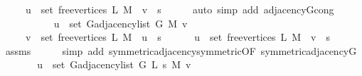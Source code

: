 \begin{isabellebody}
\ \ \ \ \ {\isacharparenleft}{\kern0pt}u\ {\isasymin}\ set\ {\isacharparenleft}{\kern0pt}free{\isacharunderscore}{\kern0pt}vertices\ L\ M{\isacharparenright}{\kern0pt}\ {\isasymand}\ v\ {\isacharequal}{\kern0pt}\ s{\isacharparenright}{\kern0pt}{\isachardoublequoteclose}\isanewline
\ \ \ \ \isamarkupfalse%
\ {\isacharparenleft}{\kern0pt}auto\ simp\ add{\isacharcolon}{\kern0pt}\ adjacency{\isacharunderscore}{\kern0pt}G{}{\isacharunderscore}{\kern0pt}{}{\isacharunderscore}{\kern0pt}cong{\isacharparenright}{\kern0pt}\isanewline
\ \ \isamarkupfalse%
\ \isamarkupfalse%
\isanewline
\ \ \ \ {\isachardoublequoteopen}{\isachardot}{\kern0pt}{\isachardot}{\kern0pt}{\isachardot}{\kern0pt}\ {\isasymlongleftrightarrow}\isanewline
\ \ \ \ \ u\ {\isasymin}\ set\ {\isacharparenleft}{\kern0pt}G{\isachardot}{\kern0pt}adjacency{\isacharunderscore}{\kern0pt}list\ {\isacharparenleft}{\kern0pt}G{}{\isacharunderscore}{\kern0pt}{}\ M{\isacharparenright}{\kern0pt}\ v{\isacharparenright}{\kern0pt}\ {\isasymor}\isanewline
\ \ \ \ \ {\isacharparenleft}{\kern0pt}v\ {\isasymin}\ set\ {\isacharparenleft}{\kern0pt}free{\isacharunderscore}{\kern0pt}vertices\ L\ M{\isacharparenright}{\kern0pt}\ {\isasymand}\ u\ {\isacharequal}{\kern0pt}\ s{\isacharparenright}{\kern0pt}\ {\isasymor}\isanewline
\ \ \ \ \ {\isacharparenleft}{\kern0pt}u\ {\isasymin}\ set\ {\isacharparenleft}{\kern0pt}free{\isacharunderscore}{\kern0pt}vertices\ L\ M{\isacharparenright}{\kern0pt}\ {\isasymand}\ v\ {\isacharequal}{\kern0pt}\ s{\isacharparenright}{\kern0pt}{\isachardoublequoteclose}\isanewline
\ \ \ \ \isamarkupfalse%
\ assms\isanewline
\ \ \ \ \isamarkupfalse%
\ {\isacharparenleft}{\kern0pt}simp\ add{\isacharcolon}{\kern0pt}\ symmetric{\isacharunderscore}{\kern0pt}adjacency{\isachardot}{\kern0pt}symmetric{\isacharbrackleft}{\kern0pt}OF\ symmetric{\isacharunderscore}{\kern0pt}adjacency{\isacharunderscore}{\kern0pt}G{}{\isacharunderscore}{\kern0pt}{}{\isacharbrackright}{\kern0pt}{\isacharparenright}{\kern0pt}\isanewline
\ \ \isamarkupfalse%
\ \isamarkupfalse%
\ {\isachardoublequoteopen}{\isachardot}{\kern0pt}{\isachardot}{\kern0pt}{\isachardot}{\kern0pt}\ {\isasymlongleftrightarrow}\ u\ {\isasymin}\ set\ {\isacharparenleft}{\kern0pt}G{\isachardot}{\kern0pt}adjacency{\isacharunderscore}{\kern0pt}list\ {\isacharparenleft}{\kern0pt}G{}{\isacharunderscore}{\kern0pt}{}\ L\ s\ M{\isacharparenright}{\kern0pt}\ v{\isacharparenright}{\kern0pt}{\isachardoublequoteclose}\isanewline

\end{isabellebody}
